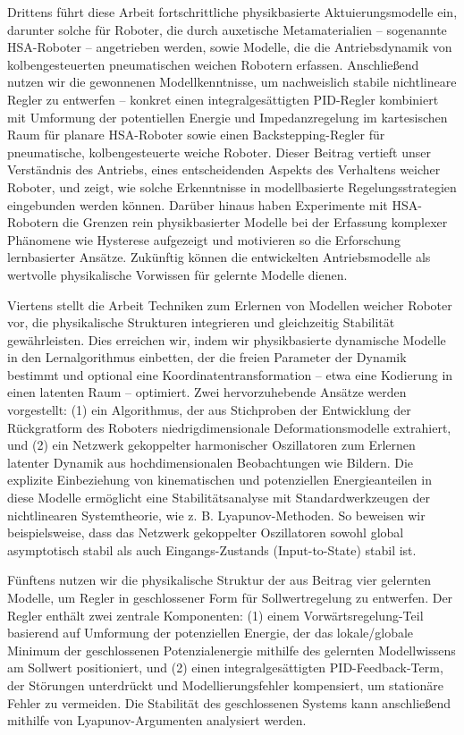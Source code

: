 {Drittens führt diese Arbeit fortschrittliche physikbasierte Aktuierungsmodelle ein, darunter solche für Roboter, die durch auxetische Metamaterialien – sogenannte HSA-Roboter – angetrieben werden, sowie Modelle, die die Antriebsdynamik von kolbengesteuerten pneumatischen weichen Robotern erfassen. Anschließend nutzen wir die gewonnenen Modellkenntnisse, um nachweislich stabile nichtlineare Regler zu entwerfen – konkret einen integralgesättigten PID-Regler kombiniert mit Umformung der potentiellen Energie und Impedanzregelung im kartesischen Raum für planare HSA-Roboter sowie einen Backstepping-Regler für pneumatische, kolbengesteuerte weiche Roboter. Dieser Beitrag vertieft unser Verständnis des Antriebs, eines entscheidenden Aspekts des Verhaltens weicher Roboter, und zeigt, wie solche Erkenntnisse in modellbasierte Regelungsstrategien eingebunden werden können. Darüber hinaus haben Experimente mit HSA-Robotern die Grenzen rein physikbasierter Modelle bei der Erfassung komplexer Phänomene wie Hysterese aufgezeigt und motivieren so die Erforschung lernbasierter Ansätze. Zukünftig können die entwickelten Antriebsmodelle als wertvolle physikalische Vorwissen für gelernte Modelle dienen.

Viertens stellt die Arbeit Techniken zum Erlernen von Modellen weicher Roboter vor, die physikalische Strukturen integrieren und gleichzeitig Stabilität gewährleisten. Dies erreichen wir, indem wir physikbasierte dynamische Modelle in den Lernalgorithmus einbetten, der die freien Parameter der Dynamik bestimmt und optional eine Koordinatentransformation – etwa eine Kodierung in einen latenten Raum – optimiert. Zwei hervorzuhebende Ansätze werden vorgestellt: (1) ein Algorithmus, der aus Stichproben der Entwicklung der Rückgratform des Roboters niedrigdimensionale Deformationsmodelle extrahiert, und (2) ein Netzwerk gekoppelter harmonischer Oszillatoren zum Erlernen latenter Dynamik aus hochdimensionalen Beobachtungen wie Bildern. Die explizite Einbeziehung von kinematischen und potenziellen Energieanteilen in diese Modelle ermöglicht eine Stabilitätsanalyse mit Standardwerkzeugen der nichtlinearen Systemtheorie, wie z. B. Lyapunov-Methoden. So beweisen wir beispielsweise, dass das Netzwerk gekoppelter Oszillatoren sowohl global asymptotisch stabil als auch Eingangs-Zustands (Input-to-State) stabil ist.

Fünftens nutzen wir die physikalische Struktur der aus Beitrag vier gelernten Modelle, um Regler in geschlossener Form für Sollwertregelung zu entwerfen. Der Regler enthält zwei zentrale Komponenten: (1) einem Vorwärtsregelung-Teil basierend auf Umformung der potenziellen Energie, der das lokale/globale Minimum der geschlossenen Potenzialenergie mithilfe des gelernten Modellwissens am Sollwert positioniert, und (2) einen integralgesättigten PID-Feedback-Term, der Störungen unterdrückt und Modellierungsfehler kompensiert, um stationäre Fehler zu vermeiden. Die Stabilität des geschlossenen Systems kann anschließend mithilfe von Lyapunov-Argumenten analysiert werden.

}
